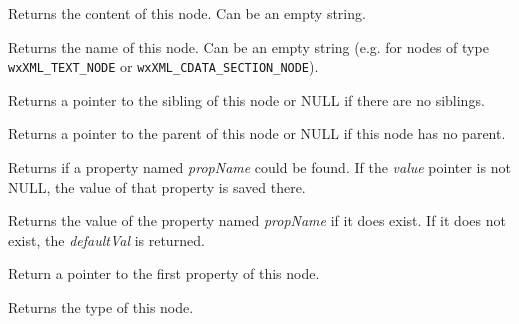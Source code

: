 \label{wxxmlnodegetcontent}


Returns the content of this node. Can be an empty string.

\label{wxxmlnodegetname}


Returns the name of this node. Can be an empty string (e.g. for nodes of type {\tt wxXML\_TEXT\_NODE} or {\tt wxXML\_CDATA\_SECTION\_NODE}).

\label{wxxmlnodegetnext}


Returns a pointer to the sibling of this node or NULL if there are no siblings.

\label{wxxmlnodegetparent}


Returns a pointer to the parent of this node or NULL if this node has no parent.

\label{wxxmlnodegetpropval}


Returns \true if a property named {\it propName} could be found.
If the {\it value} pointer is not NULL, the value of that property is saved there.


Returns the value of the property named {\it propName} if it does exist.
If it does not exist, the {\it defaultVal} is returned.

\label{wxxmlnodegetproperties}


Return a pointer to the first property of this node.

\label{wxxmlnodegettype}


Returns the type of this node.


\label{wxxmlnodehasprop}

